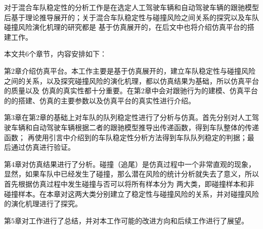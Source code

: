 对于混合车队稳定性的分析工作是在选定人工驾驶车辆和自动驾驶车辆的跟驰模型后基于理论推导展开的；关于混合车队稳定性与碰撞风险之间关系的探究以及车队碰撞风险演化机理的研究都是
基于仿真展开的，在后文中也将介绍仿真平台的搭建工作。

本文共6个章节，内容安排如下：

第2章介绍仿真平台。本工作主要是基于仿真展开的，建立车队稳定性与碰撞风险之间的关系，以及探究碰撞风险的演化机理，都以仿真结果为基础，所以仿真平台的质量以及
仿真的真实性都十分重要。在第2章中会对跟驰行为的建模、仿真平台的的搭建、仿真的主要参数以及仿真平台的真实性进行介绍。

第3章在第2章的基础上对车队的队列稳定性进行了分析与仿真。首先分别对人工驾驶车辆和自动驾驶车辆根据二者的跟驰模型推导出传递函数，得到车队整体的传递函数；
再使用引言中介绍到的车队稳定性分析方法得到车队队列稳定的判据；最后通过仿真进行验证。

第4章对仿真结果进行了分析。碰撞（追尾）是仿真过程中一个非常直观的现象，显然，如果车队中已经发生了碰撞，那么潜在风险的统计分析就失去了意义，所以首先根据仿真过程中发生碰撞与否可以将所有样本分为
两大类，即碰撞样本和非碰撞样本。在本章对这两大类分别建立了稳定性与碰撞风险的关系，并对碰撞风险的演化机理进行了探究。

第5章对工作进行了总结，并对本工作可能的改进方向和后续工作进行了展望。


